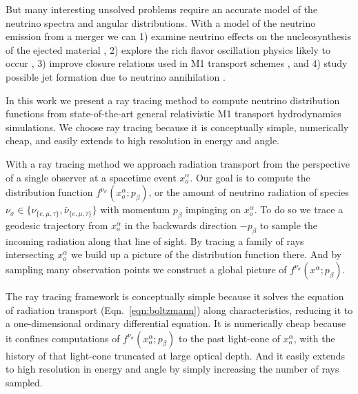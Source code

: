 \documentclass[aps,floatfix,prd,superscriptaddress,twocolumn]{revtex4-1}
\newcommand{\todo}[1]{\marginpar{\tiny{\textcolor{red}{#1}}}}
\begin{document}
But many interesting unsolved problems require an accurate model of the neutrino
spectra and angular distributions.
With a model of the neutrino emission from a merger we can
1) examine neutrino effects on the nucleosynthesis of the ejected material
\citep{surm2011-nickel_56, robe2016-sph_nu_nucleo},
2) explore the rich flavor oscillation physics likely to occur
\citep{malk2012-mnr_1, malk2015-mnr_2, malk2016-mnr_3, zhu2016-mnr_nsns_remnant,
  vaan2016-uncovering_mnr},
3) improve closure relations used in M1 transport schemes
\citep{ramp2002-truncated_moment, shib2011-truncated_moment,
  card2013-truncated_moment, fouc2015-m1_nsbh, ocon2015-gr1d_with_nu}, and
4) study possible jet formation due to neutrino annihilation
\citep{ruff1999-nunubar_nsns, asan2000-nunubar, birk2007-nunubar,
  hari2010-gr_nunubar_collapsar, zala2011-nunubar, leng2014-nunubar}.

In this work we present a ray tracing method to compute neutrino distribution
functions from state-of-the-art general relativistic M1 transport
hydrodynamics simulations.
We choose ray tracing because it is conceptually simple, numerically cheap,
and easily extends to high resolution in energy and angle.

With a ray tracing method we approach radiation transport from the perspective
of a single observer at a spacetime event $x_o^\alpha$.
Our goal is to compute the distribution function
$f^{\nu_\sigma}(x_o^\alpha;p_\beta)$, or the amount of neutrino radiation
of species $\nu_\sigma\in\{\nu_{\{e,\mu,\tau\}},\bar{\nu}_{\{e,\mu,\tau\}}\}$
with momentum $p_\beta$ impinging on $x_o^\alpha$.
To do so we trace a geodesic trajectory from $x_o^\alpha$ in the backwards
direction $-p_\beta$ to sample the incoming radiation along that line of sight.
By tracing a family of rays intersecting $x_o^\alpha$ we build up a
picture of the distribution function there.
And by sampling many observation points we construct a global picture
of $f^{\nu_\sigma}(x^\alpha;p_\beta)$.

The ray tracing framework
is conceptually simple because it solves the equation of radiation
transport (Eqn.~\ref{eqn:boltzmann}) along characteristics,
reducing it to a one-dimensional ordinary differential equation.
It is numerically cheap because it confines computations of
$f^{\nu_\sigma}(x_o^\alpha;p_\beta)$ to the past light-cone of $x_o^\alpha$,
with the history of that light-cone truncated at large optical depth.
\todo{state scaling $\mathscr{O}(n)$?}
And it easily extends to high resolution in energy and angle by simply
increasing the number of rays sampled.
\end{document}
